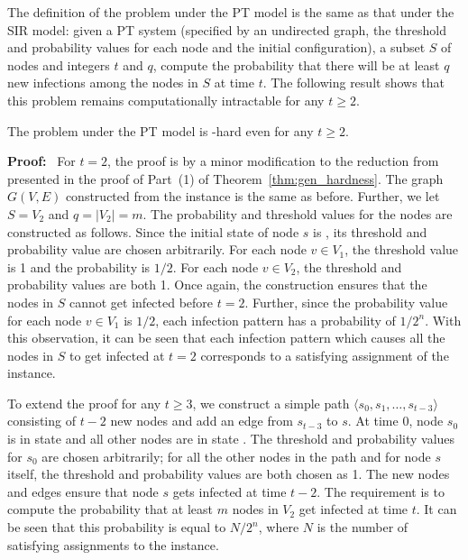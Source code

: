 The definition of the \tNewInfs{} problem under the PT model
is the same as that under the SIR model: given a PT system
(specified by an undirected graph, the threshold and probability values
for each node and the initial configuration), a subset $S$ of nodes
and integers $t$ and $q$, compute the probability that there will
be at least $q$ new infections among the nodes in $S$ at time $t$.
The following result shows that this problem remains computationally
intractable for any $t \geq 2$.

\begin{proposition}\label{pro:pt_model_two_new_inf}
The \tNewInfs{} problem under the PT model is \cnump-hard 
even for any $t \geq 2$.
\end{proposition}

\smallskip
\noindent
\textbf{Proof:}~ For $t = 2$, the proof is by a minor modification 
to the reduction from \mtsat{} 
presented in the proof of Part~(1) of Theorem~\ref{thm:gen_hardness}.
The graph $G(V,E)$ constructed from the \mtsat{} instance
is the same as before.
Further, we let $S = V_2$ and $q = |V_2| = m$. 
The probability and threshold values for the nodes are constructed as follows.
Since the initial state of node $s$ is \istate, its threshold and
probability value are chosen arbitrarily.
For each node $v \in V_1$, the threshold value is 1 and the
probability is $1/2$. 
For each node $v \in V_2$, the threshold and probability values
are both 1. 
Once again, 
the construction ensures that the nodes in $S$ cannot get 
infected before $t = 2$. 
Further, since the probability value for each node $v \in V_1$ is $1/2$,
each infection pattern has a probability of $1/2^n$.
With this observation, it can be seen that 
each infection pattern which causes all
the nodes in $S$ to get infected at $t = 2$ corresponds to a
satisfying assignment of the \mtsat{} instance. 

To extend the proof for any $t \geq 3$, 
we construct a simple path
$\langle s_0, s_1, \ldots, s_{t-3}\rangle$
consisting of $t-2$ new nodes and add an edge from $s_{t-3}$ to $s$.
At time 0, node $s_0$ is in state \istate{} and all
other nodes are in state \sstate.
The threshold and probability values for $s_0$ are chosen arbitrarily;
for all the other nodes in the path and for node $s$ itself,
the threshold and probability values are both chosen as 1.
The new nodes and edges ensure that
node $s$ gets infected at time $t-2$.
The requirement is to compute the probability that at least $m$
nodes in $V_2$ get infected at time $t$.
It can be seen that this probability is equal to $N/2^n$, where
$N$ is the number of satisfying assignments to
the \mtsat{} instance.  \QED


